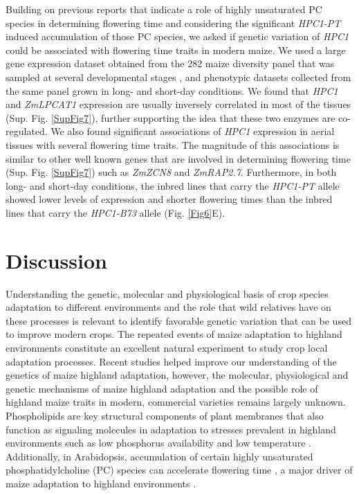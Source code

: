 \documentclass[9pt,twocolumn,twoside,lineno]{BioRxiv}
\begin{document}
Building on previous reports that indicate a role of highly unsaturated PC species in determining flowering time \cite{Nakamura2014-qf, Riedelsheimer2013-bd} and considering the significant \textit{HPC1-PT} induced accumulation of those PC species, we asked if genetic variation of \textit{HPC1} could be associated with flowering time traits in modern maize. 
We used a large gene expression dataset obtained from the 282 maize diversity panel that was sampled at several developmental stages \cite{Kremling2018-gn}, and phenotypic datasets collected from the same panel grown in long- and short-day conditions.
We found that \textit{HPC1} and \textit{ZmLPCAT1} expression are usually inversely correlated in most of the tissues (Sup. Fig. \ref{SupFig7}), further supporting the idea that these two enzymes are co-regulated. 
We also found significant associations of \textit{HPC1} expression in aerial tissues with several flowering time traits.
The magnitude of this associations is similar to other well known genes that are involved in determining flowering time (Sup. Fig. \ref{SupFig7}) such as \textit{ZmZCN8}  and \textit{ZmRAP2.7}.  
Furthermore, in both long- and short-day conditions, the inbred lines that carry the \textit{HPC1-PT} allele showed lower levels of expression and shorter flowering times than the inbred lines that carry the \textit{HPC1-B73} allele  (Fig. \ref{Fig6}E). 

 \section{Discussion}
\label{sec:discussion}
Understanding the genetic, molecular and  physiological basis of crop species adaptation to different environments and the role that wild relatives have on these processes is relevant to identify favorable genetic variation that can be used to improve modern crops.
The repeated events of maize adaptation to highland environments constitute an excellent natural experiment to study crop local adaptation processes. 
Recent studies \cite{Wang2020-mp, Takuno2015-uj, Crow2020-gene} helped improve our understanding of the genetics of maize highland adaptation, however, the molecular, physiological and genetic mechanisms of maize highland adaptation and the possible role of highland maize traits in modern, commercial varieties remains largely unknown.
Phospholipids are key structural components of plant membranes that also function as signaling molecules in adaptation to stresses prevalent in highland environments \cite{Ryu2004-iv, Nakamura2017-vb} such as low phosphorus availability \cite{Veneklaas2012-ls, Cruz-Ramirez2004-ib, Lambers2012-an} and low temperature \cite{Degenkolbe2012-wf, Welti2002-uk, Marla2017-ph}. 
Additionally, in Arabidopsis, accumulation of certain highly unsaturated phosphatidylcholine (PC) species can accelerate flowering time \cite{Nakamura2014-qf}, a major driver of maize adaptation to highland environments \cite{Romero_Navarro2017-cn, Gates2019-xu}.
 
\end{document}
